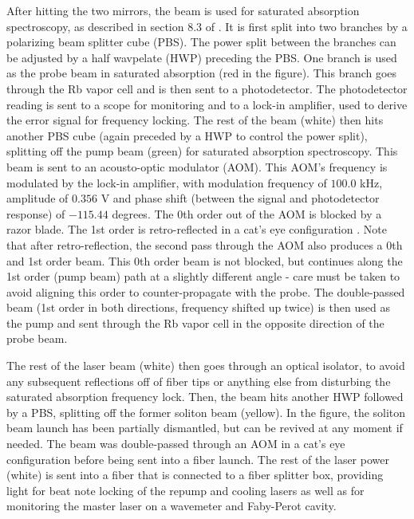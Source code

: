 After hitting the two mirrors, the beam is used for saturated absorption spectroscopy, as described in section 8.3 of \cite{Foot}. It is first split into two branches by a polarizing beam splitter cube (PBS). The power split between the branches can be adjusted by a half wavpelate (HWP) preceding the PBS. One branch is used as the probe beam in saturated absorption (red in the figure). This branch goes through the Rb vapor cell and is then sent to a photodetector. The photodetector reading is sent to a scope for monitoring and to a lock-in amplifier, used to derive the error signal for frequency locking.  The rest of the beam (white) then hits another PBS cube (again preceded by a HWP to control the power split), splitting off the pump beam (green) for saturated absorption spectroscopy. This beam is sent to an acousto-optic modulator (AOM). This AOM's frequency is modulated by the lock-in amplifier, with modulation frequency of $100.0$ kHz, amplitude of $0.356$ V and phase shift (between the signal and photodetector response) of $-115.44$ degrees. The 0th order out of the AOM is blocked by a razor blade. The 1st order is retro-reflected in a cat's eye configuration \cite{Donley2005}. Note that after retro-reflection, the second pass through the AOM also produces a 0th and 1st order beam. This 0th order beam is not blocked, but continues along the 1st order (pump beam) path at a slightly different angle - care must be taken to avoid aligning this order to counter-propagate with the probe.   The double-passed beam (1st order in both directions, frequency shifted up twice) is then used as the pump and sent through the Rb vapor cell in the opposite direction of the probe beam.  

The rest of the laser beam (white) then goes through an optical isolator, to avoid any subsequent reflections off of fiber tips or anything else from disturbing the saturated absorption frequency lock. Then, the beam hits another HWP followed by a PBS, splitting off the former soliton beam (yellow). In the figure, the soliton beam launch has been partially dismantled, but can be revived at any moment if needed. The beam was double-passed through an AOM in a cat's eye configuration before being sent into a fiber launch. The rest of the laser power (white) is sent into a fiber that is connected to  a fiber splitter box, providing light for beat note locking of the \Rb{} repump and cooling lasers as well as for monitoring the master laser on a wavemeter and Faby-Perot cavity. 

